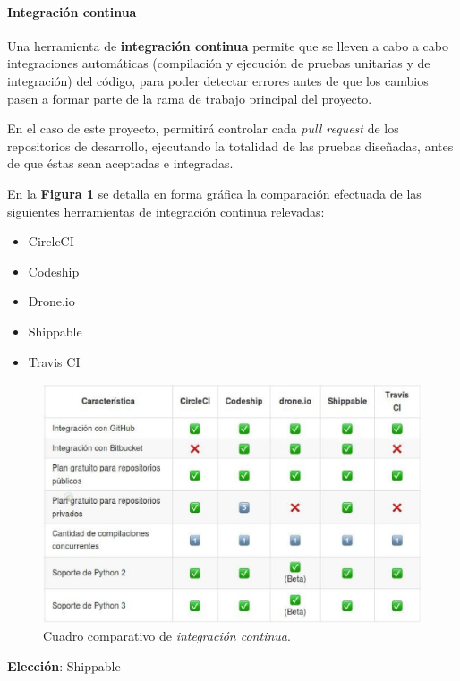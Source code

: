 \paragraph{Integración continua}

	Una herramienta de \textbf{integración continua} permite que se lleven a cabo a cabo integraciones automáticas (compilación y ejecución de pruebas unitarias y de integración) del código, para poder detectar errores antes de que los cambios pasen a formar parte de la rama de trabajo principal del proyecto.

En el caso de este proyecto, permitirá controlar cada \textit{pull request} de los repositorios de desarrollo, ejecutando la totalidad de las pruebas diseñadas, antes de que éstas sean aceptadas e integradas.

En la \textbf{Figura \ref{comparativaIC}} se detalla en forma gráfica la comparación efectuada de las siguientes herramientas de integración continua relevadas:
\begin{itemize}
    \item CircleCI
    \item Codeship
    \item Drone.io
    \item Shippable
    \item Travis CI
\end{itemize}


\begin{figure}
  \centering
\includegraphics[width=1\textwidth]{img/tp2_definicion/integContinua}
  \caption{Cuadro comparativo de \textit{integración continua}.}
  \label{comparativaIC}
\end{figure}

\textbf{Elección}: Shippable

